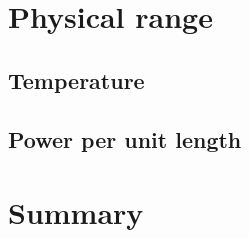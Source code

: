\section{Physical range}
\label{sec:bipolar.physical}


\subsection{Temperature}
\label{sec:bipolar.physical.temperature}


\subsection{Power per unit length}
\label{sec:bipolar.physical.power}


\section{Summary}
\label{sec:bipolar.summary}

